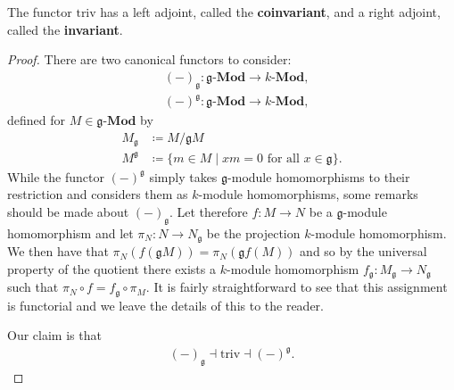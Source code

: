\begin{proposition}
  \label{prop:triv}
  The functor $ \text{triv} $ has a left adjoint, called the \textbf{coinvariant}, and a right adjoint, called the \textbf{invariant}.
\end{proposition}
\begin{proof}
  There are two canonical functors to consider:
  \begin{align*}
    &(-)_{\mathfrak{g}}: \mathfrak{g}\text{-}\mathbf{Mod} \to k\text{-}\mathbf{Mod}, \\
    &(-)^{\mathfrak{g}}: \mathfrak{g}\text{-}\mathbf{Mod} \to k\text{-}\mathbf{Mod},
  \end{align*}
  defined for $ M \in \mathfrak{g}\text{-}\mathbf{Mod} $ by
  \begin{align*}
    M_{\mathfrak{g}} &\coloneqq M/\mathfrak{g}M \\
    M^\mathfrak{g} &\coloneqq \{m \in M \mid xm=0 \text{ for all } x \in \mathfrak{g}\}
  .\end{align*}
  While the functor $ (-)^{\mathfrak{g}} $ simply takes $ \mathfrak{g} $-module homomorphisms to their restriction and considers them as $ k $-module homomorphisms, some remarks should be made about $ (-)_\mathfrak{g} $. Let therefore $ f: M \to N $ be a $ \mathfrak{g} $-module homomorphism and let $ \pi_N: N \to N_\mathfrak{g} $ be the projection $ k $-module homomorphism. We then have that $ \pi_N(f(\mathfrak{g}M)) = \pi_N(\mathfrak{g}f(M)) $ and so by the universal property of the quotient there exists a $ k $-module homomorphism $ f_\mathfrak{g}: M_\mathfrak{g} \to N_\mathfrak{g} $ such that $ \pi_N \circ f = f_\mathfrak{g}\circ \pi_M  $. It is fairly straightforward to see that this assignment is functorial and we leave the details of this to the reader.

  Our claim is that
  \begin{align*}
    (-)_{\mathfrak{g}} \dashv \text{triv} \dashv (-)^\mathfrak{g}
  .\end{align*}


\end{proof}
